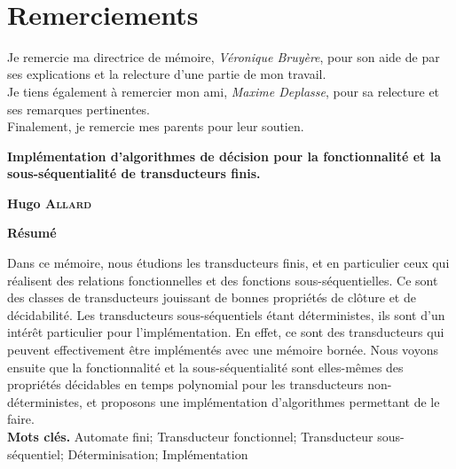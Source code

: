 \documentclass[12pt,twoside,openleft]{book}
\begin{document}
	
	\begin{titlepage}
		
	\end{titlepage}
	\newpage
	~
	\thispagestyle{empty}
	\newpage
	\thispagestyle{empty}
	\chapter*{Remerciements}
	Je remercie ma directrice de mémoire, \emph{Véronique Bruyère}, pour son aide de par ses explications et la relecture d'une partie de mon travail. \\
	Je tiens également à remercier mon ami, \emph{Maxime Deplasse}, pour sa relecture et ses remarques pertinentes. \\
	Finalement, je remercie mes parents pour leur soutien.
	\thispagestyle{empty}
	\newpage
	
	\newpage\null\thispagestyle{empty}\newpage
	
	\thispagestyle{empty}
	\begin{center}
		\Large
		\textbf{Implémentation d'algorithmes de décision pour la fonctionnalité et la sous-séquentialité de transducteurs finis.}
		
		\vspace{0.4cm}
		\textbf{Hugo \textsc{Allard}}
		
		\vspace{0.9cm}
		\textbf{Résumé}
	\end{center}
	Dans ce mémoire, nous étudions les transducteurs finis, et en particulier ceux qui réalisent des relations fonctionnelles et des fonctions sous-séquentielles. Ce sont des classes de transducteurs jouissant de bonnes propriétés de clôture et de décidabilité. Les transducteurs sous-séquentiels étant déterministes, ils sont d'un intérêt particulier pour l'implémentation. En effet, ce sont des transducteurs qui peuvent effectivement être implémentés avec une mémoire bornée. Nous voyons ensuite que la fonctionnalité et la sous-séquentialité sont elles-mêmes des propriétés décidables en temps polynomial pour les transducteurs non-déterministes, et proposons une implémentation d'algorithmes permettant de le faire. \\
	
	\noindent \textbf{Mots clés.} Automate fini; Transducteur fonctionnel; Transducteur sous-séquentiel; Déterminisation; Implémentation
	
	\newpage\null\thispagestyle{empty}\newpage
	\pagestyle{empty}
	\tableofcontents
	\cleardoublepage
	\parindent=20pt
	
\end{document}
